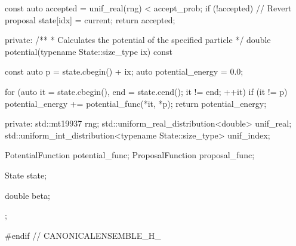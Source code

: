 {{        const auto accepted = unif_real(rng) < accept_prob;
        if (!accepted) {
            // Revert proposal
            state[idx] = current;
        }
        return accepted;
    }

private:
    /**
     * Calculates the potential of the specified particle
     */
    double potential(typename State::size_type ix) const {
        const auto p = state.cbegin() + ix;
        auto potential_energy = 0.0;

        for (auto it = state.cbegin(), end = state.cend(); it != end; ++it) {
            if (it != p) {
                potential_energy += potential_func(*it, *p);
            }
        }
        return potential_energy;
    }

private:
    std::mt19937 rng;
    std::uniform_real_distribution<double> unif_real;
    std::uniform_int_distribution<typename State::size_type> unif_index;

    PotentialFunction potential_func;
    ProposalFunction proposal_func;

    State state;

    double beta;
};

#endif // CANONICALENSEMBLE_H_
